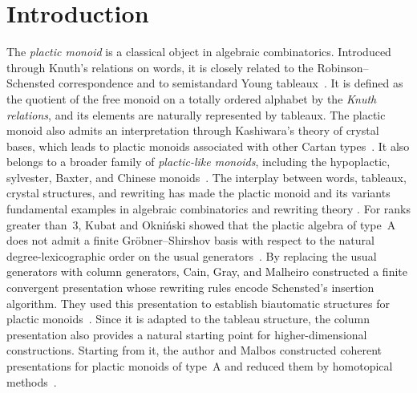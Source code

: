 \documentclass[a4paper, twoside, 11pt, english]{article}
\begin{document}
\vspace{0.5cm} 



\section{Introduction}
The \emph{plactic monoid} is a classical object in algebraic combinatorics. 
Introduced through Knuth's relations on words, it is closely related to the Robinson--Schensted correspondence and to semistandard Young tableaux~\cite{Knuth70,LascouxSchutzenberger81,Fulton97}. It is defined as the quotient of the free monoid on a totally ordered alphabet by the \emph{Knuth relations}, and its elements are naturally represented by tableaux.
The plactic monoid also admits an interpretation through Kashiwara's
theory of crystal bases, which leads to plactic monoids associated with
other Cartan types~\cite{Kashiwara91,Lecouvey02,Lecouvey03}.
It also belongs to a broader family of
\emph{plactic-like monoids}, including the hypoplactic, sylvester,
Baxter, and Chinese monoids~\cite{CainGrayMalheiro15b,CainMalheiro19}. 
The interplay between words, tableaux, crystal
structures, and rewriting has made the plactic monoid and its variants
fundamental examples in algebraic combinatorics and rewriting theory
\cite{CainGrayMalheiro15, CainGrayMalheiro19, Hage25, Hage26, Hage2021Super,Hage15,
HageMalbos22,HageMalbos17,Hage2022RSK}.
For ranks greater than~$3$, Kubat and Okniński showed that the plactic
algebra of type~A does not admit a finite Gröbner--Shirshov basis with respect to the
natural degree-lexicographic order on the usual generators~\cite{KubatOkninski14}. By replacing the usual generators with column
generators, Cain, Gray, and Malheiro constructed a finite convergent
presentation whose rewriting rules encode Schensted's insertion algorithm. They used this presentation to establish biautomatic structures for plactic monoids~\cite{CainGrayMalheiro15}. Since it is adapted to the tableau structure, the column presentation also provides a natural starting point for higher-dimensional constructions. Starting from it, the author and Malbos constructed coherent presentations for plactic monoids of type~A and reduced them by homotopical methods~\cite{HageMalbos17}.
\end{document}
